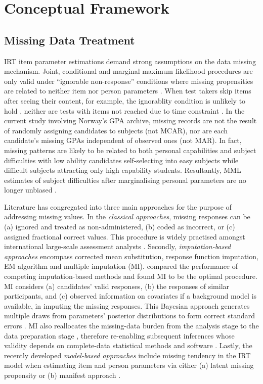 \section{Conceptual Framework}


\subsection{Missing Data Treatment}

IRT item parameter estimations demand strong assumptions on the data missing mechanism. Joint, conditional and marginal maximum likelihood procedures are only valid under ``ignorable non-response'' conditions where missing propensities are related to neither item nor person parameters \parencite{molenaar:1995}. When test takers skip items after seeing their content, for example, the ignorablity condition is unlikely to hold \parencite{mislevy:1987}, neither are tests with items not reached due to time constraint \parencite{lord:1974, lord:1983}. In the current study involving Norway's GPA archive, missing records are not the result of randomly assigning candidates to subjects (not MCAR), nor are each candidate's missing GPAs independent of observed ones (not MAR). In fact, missing patterns are likely to be related to both personal capabilities and subject difficulties with low ability candidates self-selecting into easy subjects while difficult subjects attracting only high capability students. Resultantly, MML estimates of subject difficulties after marginalising personal parameters are no longer unbiased \parencite[][Table 2]{mislevy:1988}.

Literature has congregated into three main approaches for the purpose of addressing missing values. In the \emph{classical approaches}, missing responses can be (a) ignored and treated as non-administered, (b) coded as incorrect, or (c) assigned fractional correct values. This procedure is widely practised amongst international large-scale assessment analysts \parencite{pohl:2014}. Secondly, \emph{imputation-based approaches} encompass corrected mean substitution, response function imputation, EM algorithm and multiple imputation (MI). \textcite{finch:2008} compared the performance of competing imputation-based methods and found MI to be the optimal procedure. MI considers (a) candidates' valid responses, (b) the responses of similar participants, and (c) observed information on covariates if a background model is available, in imputing the missing responses. This Bayesian approach generates multiple draws from parameters' posterior distributions to form correct standard errors \parencite{carpenter:2013}. MI also reallocates the missing-data burden from the analysis stage to the data preparation stage \parencite{reiter:2007}, therefore re-enabling subsequent inferences whose validity depends on complete-data statistical methods and software \parencite[][Chapter 4]{rubin:1987}. Lastly, the recently developed \emph{model-based approaches} include missing tendency in the IRT model when estimating item and person parameters via either (a) latent missing propensity \parencite{holman:2005, glas:2008, glas:2015,korobko:2008} or (b) manifest approach \parencite{rose:2010}.

